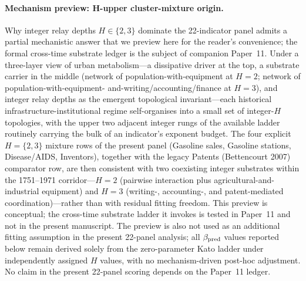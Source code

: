 \paragraph{Mechanism preview: H-upper cluster-mixture origin.}
Why integer relay depths $H{\in}\{2,3\}$ dominate the 22-indicator panel
admits a partial mechanistic answer that we preview here for the reader's
convenience; the formal cross-time substrate ledger is the subject of
companion Paper~11. Under a three-layer view of urban metabolism---a
dissipative driver at the top, a substrate carrier in the middle (network
of population-with-equipment at $H{=}2$; network of population-with-equipment-
and-writing/accounting/finance at $H{=}3$), and integer relay depths as the
emergent topological invariant---each historical infrastructure-institutional
regime self-organises into a small set of integer-$H$ topologies, with the
upper two adjacent integer rungs of the available ladder routinely carrying
the bulk of an indicator's exponent budget. The four explicit $H{=}\{2,3\}$
mixture rows of the present panel (Gasoline sales, Gasoline stations,
Disease/AIDS, Inventors), together with the legacy Patents (Bettencourt 2007)
comparator row, are then consistent with two coexisting integer substrates
within the 1751--1971 corridor---$H{=}2$ (pairwise interaction plus
agricultural-and-industrial equipment) and $H{=}3$ (writing-, accounting-,
and patent-mediated coordination)---rather than with residual fitting freedom.
This preview is conceptual; the cross-time substrate ladder it invokes is
tested in Paper~11 and not in the present manuscript. The preview is also
not used as an additional fitting assumption in the present 22-panel analysis;
all $\beta_{\rm pred}$ values reported below remain derived solely from the
zero-parameter Kato ladder under independently assigned $H$ values, with no
mechanism-driven post-hoc adjustment. No claim in the present 22-panel
scoring depends on the Paper~11 ledger.

